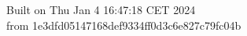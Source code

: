 {\noindent Built on Thu Jan  4 16:47:18 CET 2024} \\ 
 {\noindent from 1e3dfd05147168def9334ff0d3c6e827c79fc04b}
